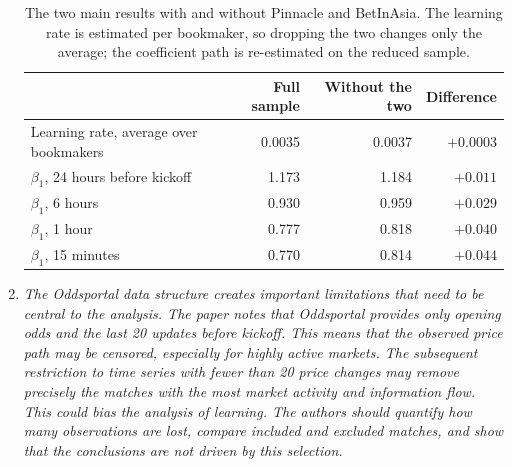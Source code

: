 \documentclass[letterpaper,12pt]{article}
\newcounter{b}
\begin{document}
\begin{enumerate}
{\begin{table}[H]
\centering
\caption{The two main results with and without Pinnacle and BetInAsia. The learning rate is estimated per bookmaker, so dropping the two changes only the average; the coefficient path is re-estimated on the reduced sample.}
\label{tab:r1c4b}
\small
\begin{tabular}{lrrr}
\toprule
 & Full sample & Without the two & Difference \\
\midrule
Learning rate, average over bookmakers & 0.0035 & 0.0037 & $+0.0003$ \\
\midrule
$\beta_1$, 24 hours before kickoff  & 1.173 & 1.184 & $+0.011$ \\
$\beta_1$, 6 hours                  & 0.930 & 0.959 & $+0.029$ \\
$\beta_1$, 1 hour                   & 0.777 & 0.818 & $+0.040$ \\
$\beta_1$, 15 minutes               & 0.770 & 0.814 & $+0.044$ \\
\bottomrule
\end{tabular}
\end{table}
}

\item \textit{The Oddsportal data structure creates important limitations that need to be central
to the analysis. The paper notes that Oddsportal provides only opening odds and
the last 20 updates before kickoff. This means that the observed price path may be
censored, especially for highly active markets. The subsequent restriction to time series with fewer than 20 price changes may remove precisely the matches with the
most market activity and information flow. This could bias the analysis of learning.
The authors should quantify how many observations are lost, compare included and
excluded matches, and show that the conclusions are not driven by this selection.}


\end{enumerate}
\end{document}
